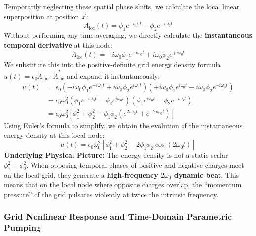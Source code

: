 \documentclass[12pt, a4paper]{article}
\begin{document}
Temporarily neglecting these spatial phase shifts, we calculate the local linear superposition at position $\vec{x}$:
\begin{equation}
A_{\mathrm{loc}}(t) = \phi_1 e^{-i\omega_0 t} + \phi_2 e^{+i\omega_0 t}
\end{equation}
Without performing any time averaging, we directly calculate the \textbf{instantaneous temporal derivative} at this node:
\begin{equation}
\dot{A}_{\mathrm{loc}}(t) = -i\omega_0 \phi_1 e^{-i\omega_0 t} + i\omega_0 \phi_2 e^{+i\omega_0 t}
\end{equation}
We substitute this into the positive-definite grid energy density formula $u(t) = \epsilon_0 \dot{A}_{\mathrm{loc}} \cdot \dot{A}_{\mathrm{loc}}^*$ and expand it instantaneously:
\begin{align}
u(t) &= \epsilon_0 \left( -i\omega_0 \phi_1 e^{-i\omega_0 t} + i\omega_0 \phi_2 e^{i\omega_0 t} \right) \left( +i\omega_0 \phi_1 e^{i\omega_0 t} - i\omega_0 \phi_2 e^{-i\omega_0 t} \right) \nonumber \\
&= \epsilon_0 \omega_0^2 \left( \phi_1 e^{-i\omega_0 t} - \phi_2 e^{i\omega_0 t} \right) \left( \phi_1 e^{i\omega_0 t} - \phi_2 e^{-i\omega_0 t} \right) \nonumber \\
&= \epsilon_0 \omega_0^2 \left[ \phi_1^2 + \phi_2^2 - \phi_1 \phi_2 \left( e^{2i\omega_0 t} + e^{-2i\omega_0 t} \right) \right]
\end{align}
Using Euler's formula to simplify, we obtain the evolution of the instantaneous energy density at this local node:
\begin{equation}
u(t) = \epsilon_0 \omega_0^2 \left[ \phi_1^2 + \phi_2^2 - 2\phi_1 \phi_2 \cos(2\omega_0 t) \right]
\end{equation}
\textbf{Underlying Physical Picture:} The energy density is not a static scalar $\phi_1^2 + \phi_2^2$. When opposing temporal phases of positive and negative charges meet on the local grid, they generate a \textbf{high-frequency $2\omega_0$ dynamic beat}. This means that on the local node where opposite charges overlap, the ``momentum pressure'' of the grid pulsates violently at twice the intrinsic frequency.

\subsubsection{Grid Nonlinear Response and Time-Domain Parametric Pumping}
\end{document}
